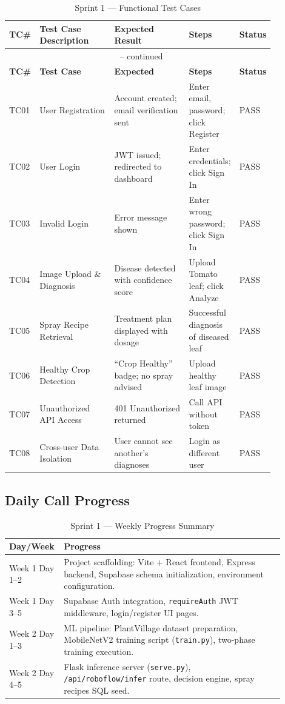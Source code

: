 \documentclass[12pt,a4paper]{report}
\begin{document}
\begin{longtable}{p{0.06\linewidth} p{0.28\linewidth} p{0.28\linewidth} p{0.15\linewidth} p{0.10\linewidth}}
\caption{Sprint 1 — Functional Test Cases} \label{tab:sprint1tc} \\
\toprule
\textbf{TC\#} & \textbf{Test Case Description} & \textbf{Expected Result} & \textbf{Steps} & \textbf{Status} \\
\midrule
\endfirsthead
\multicolumn{5}{c}{\tablename\ \thetable{} -- continued} \\
\toprule
\textbf{TC\#} & \textbf{Test Case} & \textbf{Expected} & \textbf{Steps} & \textbf{Status} \\
\midrule
\endhead
TC01 & User Registration & Account created; email verification sent & Enter email, password; click Register & PASS \\
TC02 & User Login & JWT issued; redirected to dashboard & Enter credentials; click Sign In & PASS \\
TC03 & Invalid Login & Error message shown & Enter wrong password; click Sign In & PASS \\
TC04 & Image Upload \& Diagnosis & Disease detected with confidence score & Upload Tomato leaf; click Analyze & PASS \\
TC05 & Spray Recipe Retrieval & Treatment plan displayed with dosage & Successful diagnosis of diseased leaf & PASS \\
TC06 & Healthy Crop Detection & ``Crop Healthy'' badge; no spray advised & Upload healthy leaf image & PASS \\
TC07 & Unauthorized API Access & 401 Unauthorized returned & Call API without token & PASS \\
TC08 & Cross-user Data Isolation & User cannot see another's diagnoses & Login as different user & PASS \\
\bottomrule
\end{longtable}

\subsection{Daily Call Progress}

\begin{table}[H]
\centering
\caption{Sprint 1 — Weekly Progress Summary}
\begin{tabular}{p{0.12\linewidth} p{0.78\linewidth}}
\toprule
\textbf{Day/Week} & \textbf{Progress} \\
\midrule
Week 1 Day 1--2 & Project scaffolding: Vite + React frontend, Express backend, Supabase schema initialization, environment configuration. \\
Week 1 Day 3--5 & Supabase Auth integration, \texttt{requireAuth} JWT middleware, login/register UI pages. \\
Week 2 Day 1--3 & ML pipeline: PlantVillage dataset preparation, MobileNetV2 training script (\texttt{train.py}), two-phase training execution. \\
Week 2 Day 4--5 & Flask inference server (\texttt{serve.py}), \texttt{/api/roboflow/infer} route, decision engine, spray recipes SQL seed. \\
\bottomrule
\end{tabular}
\end{table}
\end{document}
